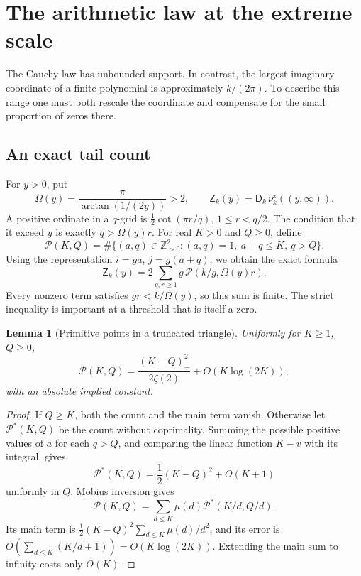 \documentclass[11pt]{article}
\numberwithin{equation}{section}
\newtheorem{lemma}[theorem]{Lemma}
\theoremstyle{definition}
\theoremstyle{remark}
\newcommand{\hznu}{\nu^{\mathrm z}}
\begin{document}
\section{The arithmetic law at the extreme scale}\label{mxc:hz:sec:edge}

The Cauchy law has unbounded support. In contrast, the largest imaginary
coordinate of a finite polynomial is approximately $k/(2\pi)$. To describe
this range one must both rescale the coordinate and compensate for the
small proportion of zeros there.

\subsection{An exact tail count}

For $y>0$, put
\begin{equation}\label{mxc:hz:eq:beta}
 \Omega(y)=\frac{\pi}{\arctan(1/(2y))}>2,\qquad
 \mathsf Z_k(y)=\mathsf D_k\,\hznu_k((y,\infty)).
\end{equation}
A positive ordinate in a $q$-grid is $\frac12\cot(\pi r/q)$, $1\le r<q/2$.
The condition that it exceed $y$ is exactly $q>\Omega(y)r$. For real
$K>0$ and $Q\ge0$, define
\[
 \mathcal P(K,Q)=
 \#\{(a,q)\in\mathbb Z_{>0}^2:(a,q)=1,\ a+q\le K,\ q>Q\}.
\]
Using the representation $i=ga$, $j=g(a+q)$, we obtain the exact formula
\begin{equation}\label{mxc:hz:eq:tail-exact}
 \mathsf Z_k(y)=2\sum_{g,r\ge1}g\,\mathcal P(k/g,\Omega(y)r).
\end{equation}
Every nonzero term satisfies $gr<k/\Omega(y)$, so this sum is finite. The
strict inequality is important at a threshold that is itself a zero.

\begin{lemma}[Primitive points in a truncated triangle]\label{mxc:hz:lem:triangle}
Uniformly for $K\ge1$, $Q\ge0$,
\begin{equation}\label{mxc:hz:eq:triangle}
 \mathcal P(K,Q)=\frac{(K-Q)_+^2}{2\zeta(2)}+O(K\log(2K)),
\end{equation}
with an absolute implied constant.
\end{lemma}

\begin{proof}
If $Q\ge K$, both the count and the main term vanish. Otherwise let
$\mathcal P^\ast(K,Q)$ be the count without coprimality. Summing the
possible positive values of $a$ for each $q>Q$, and comparing the linear
function $K-v$ with its integral, gives
\[
 \mathcal P^\ast(K,Q)=\frac12(K-Q)^2+O(K+1)
\]
uniformly in $Q$. M\"obius inversion gives
\[
 \mathcal P(K,Q)=\sum_{d\le K}\mu(d)\mathcal P^\ast(K/d,Q/d).
\]
Its main term is $\frac12(K-Q)^2\sum_{d\le K}\mu(d)/d^2$, and its error is
$O(\sum_{d\le K}(K/d+1))=O(K\log(2K))$. Extending the main sum to infinity
costs only $O(K)$.
\end{proof}
\end{document}
